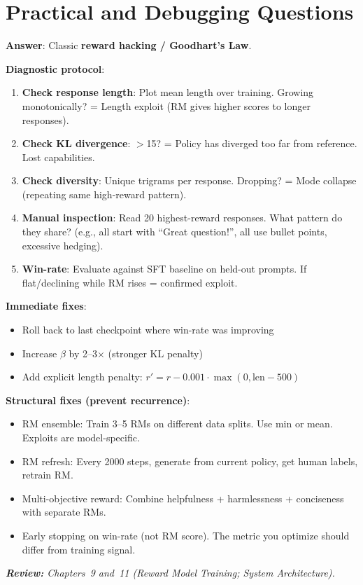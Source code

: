 \section{Practical and Debugging Questions}
\label{practical-and-debugging-questions}

\begin{questionbox}
\textbf{Answer}: Classic \textbf{reward hacking / Goodhart’s Law}.

\textbf{Diagnostic protocol}:

\begin{enumerate}
  \item \textbf{Check response length}: Plot mean length over training. Growing monotonically? = Length exploit (RM gives higher scores to longer responses).
  \item \textbf{Check KL divergence}: $>$15? = Policy has diverged too far from reference. Lost capabilities.
  \item \textbf{Check diversity}: Unique trigrams per response. Dropping? = Mode collapse (repeating same high-reward pattern).
  \item \textbf{Manual inspection}: Read 20 highest-reward responses. What pattern do they share? (e.g., all start with ``Great question!'', all use bullet points, excessive hedging).
  \item \textbf{Win-rate}: Evaluate against SFT baseline on held-out prompts. If flat/declining while RM rises = confirmed exploit.
\end{enumerate}

\textbf{Immediate fixes}:

\begin{itemize}
  \item Roll back to last checkpoint where win-rate was improving
  \item Increase $\beta$ by 2--3$\times$ (stronger KL penalty)
  \item Add explicit length penalty: $r' = r - 0.001 \cdot \max(0, \text{len} - 500)$
\end{itemize}

\textbf{Structural fixes (prevent recurrence)}:

\begin{itemize}
  \item RM ensemble: Train 3--5 RMs on different data splits. Use min or mean. Exploits are model-specific.
  \item RM refresh: Every 2000 steps, generate from current policy, get human labels, retrain RM.
  \item Multi-objective reward: Combine helpfulness + harmlessness + conciseness with separate RMs.
  \item Early stopping on win-rate (not RM score). The metric you optimize should differ from training signal.
\end{itemize}

\emph{\textbf{Review:} Chapters~9 and~11 (Reward Model Training; System Architecture).}
\end{questionbox}

